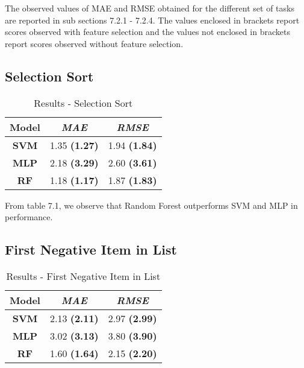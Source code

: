 The observed values of MAE and RMSE obtained for the different set of tasks are reported in sub sections 7.2.1 - 7.2.4. The values enclosed in brackets report scores observed with feature selection and the values not enclosed in brackets report scores observed without feature selection. 

\subsection{Selection Sort}

\begin{table}[h]
\centering
\begin{tabular}{|c|c|c|}
\hline
\textbf{Model} & \textit{\textbf{MAE}} & \textit{\textbf{RMSE}} \\ \hline
\textbf{SVM}   & 1.35 \textbf{(1.27)}           & 1.94 \textbf{(1.84)}            \\ \hline
\textbf{MLP}   & 2.18 \textbf{(3.29)}           & 2.60 \textbf{(3.61)}             \\ \hline
\textbf{RF}    & 1.18 \textbf{(1.17)}           & 1.87 \textbf{(1.83)}            \\ \hline
\end{tabular}
\caption{Results - Selection Sort}
\label{tab:selsort}
\end{table}

From table 7.1, we observe that Random Forest outperforms SVM and MLP in performance. 


\subsection{First Negative Item in List}

\begin{table}[h]
\centering
\begin{tabular}{|c|c|c|}
\hline
\textbf{Model} & \textit{\textbf{MAE}} & \textit{\textbf{RMSE}} \\ \hline
\textbf{SVM}   & 2.13 \textbf{(2.11)}           & 2.97 \textbf{(2.99)}            \\ \hline
\textbf{MLP}   & 3.02 \textbf{(3.13)}           & 3.80 \textbf{(3.90)}            \\ \hline
\textbf{RF}    & 1.60 \textbf{(1.64)}           & 2.15 \textbf{(2.20)}            \\ \hline
\end{tabular}
\caption{Results - First Negative Item in List}
\label{tab:first-neg}
\end{table}

